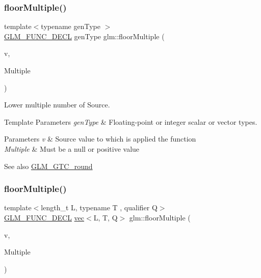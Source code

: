 \subsubsection{\texorpdfstring{floor\+Multiple()}{floorMultiple()}\hspace{0.1cm}{\footnotesize\ttfamily [1/2]}}
{\footnotesize\ttfamily template$<$typename gen\+Type $>$ \\
\hyperlink{setup_8hpp_ab2d052de21a70539923e9bcbf6e83a51}{G\+L\+M\+\_\+\+F\+U\+N\+C\+\_\+\+D\+E\+CL} gen\+Type glm\+::floor\+Multiple (\begin{DoxyParamCaption}\item[{gen\+Type}]{v,  }\item[{gen\+Type}]{Multiple }\end{DoxyParamCaption})}

Lower multiple number of Source.


\begin{DoxyTemplParams}{Template Parameters}
{\em gen\+Type} & Floating-\/point or integer scalar or vector types.\\
\hline
\end{DoxyTemplParams}

\begin{DoxyParams}{Parameters}
{\em v} & Source value to which is applied the function \\
\hline
{\em Multiple} & Must be a null or positive value\\
\hline
\end{DoxyParams}
\begin{DoxySeeAlso}{See also}
\hyperlink{group__gtc__round}{G\+L\+M\+\_\+\+G\+T\+C\+\_\+round} 
\end{DoxySeeAlso}
\mbox{\label{group__gtc__round_gacdd8901448f51f0b192380e422fae3e4}} 
\subsubsection{\texorpdfstring{floor\+Multiple()}{floorMultiple()}\hspace{0.1cm}{\footnotesize\ttfamily [2/2]}}
{\footnotesize\ttfamily template$<$length\+\_\+t L, typename T , qualifier Q$>$ \\
\hyperlink{setup_8hpp_ab2d052de21a70539923e9bcbf6e83a51}{G\+L\+M\+\_\+\+F\+U\+N\+C\+\_\+\+D\+E\+CL} \hyperlink{structglm_1_1vec}{vec}$<$L, T, Q$>$ glm\+::floor\+Multiple (\begin{DoxyParamCaption}\item[{\hyperlink{structglm_1_1vec}{vec}$<$ L, T, Q $>$ const \&}]{v,  }\item[{\hyperlink{structglm_1_1vec}{vec}$<$ L, T, Q $>$ const \&}]{Multiple }\end{DoxyParamCaption})}


